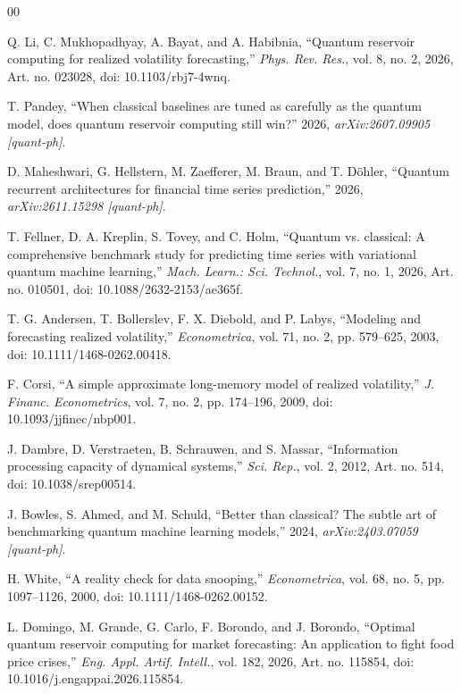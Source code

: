 \documentclass{ieeeaccess}
\begin{document}
\begin{thebibliography}{00}

Q. Li, C. Mukhopadhyay, A. Bayat, and A. Habibnia, ``Quantum reservoir computing for realized volatility forecasting,'' \emph{Phys. Rev. Res.}, vol. 8, no. 2, 2026, Art. no. 023028, doi: 10.1103/rbj7-4wnq.

T. Pandey, ``When classical baselines are tuned as carefully as the quantum model, does quantum reservoir computing still win?'' 2026, \emph{arXiv:2607.09905 [quant-ph]}.

D. Maheshwari, G. Hellstern, M. Zaefferer, M. Braun, and T. D\"ohler, ``Quantum recurrent architectures for financial time series prediction,'' 2026, \emph{arXiv:2611.15298 [quant-ph]}.

T. Fellner, D. A. Kreplin, S. Tovey, and C. Holm, ``Quantum vs. classical: A comprehensive benchmark study for predicting time series with variational quantum machine learning,'' \emph{Mach. Learn.: Sci. Technol.}, vol. 7, no. 1, 2026, Art. no. 010501, doi: 10.1088/2632-2153/ae365f.

T. G. Andersen, T. Bollerslev, F. X. Diebold, and P. Labys, ``Modeling and forecasting realized volatility,'' \emph{Econometrica}, vol. 71, no. 2, pp. 579--625, 2003, doi: 10.1111/1468-0262.00418.

F. Corsi, ``A simple approximate long-memory model of realized volatility,'' \emph{J. Financ. Econometrics}, vol. 7, no. 2, pp. 174--196, 2009, doi: 10.1093/jjfinec/nbp001.

J. Dambre, D. Verstraeten, B. Schrauwen, and S. Massar, ``Information processing capacity of dynamical systems,'' \emph{Sci. Rep.}, vol. 2, 2012, Art. no. 514, doi: 10.1038/srep00514.

J. Bowles, S. Ahmed, and M. Schuld, ``Better than classical? The subtle art of benchmarking quantum machine learning models,'' 2024, \emph{arXiv:2403.07059 [quant-ph]}.

H. White, ``A reality check for data snooping,'' \emph{Econometrica}, vol. 68, no. 5, pp. 1097--1126, 2000, doi: 10.1111/1468-0262.00152.

L. Domingo, M. Grande, G. Carlo, F. Borondo, and J. Borondo, ``Optimal quantum reservoir computing for market forecasting: An application to fight food price crises,'' \emph{Eng. Appl. Artif. Intell.}, vol. 182, 2026, Art. no. 115854, doi: 10.1016/j.engappai.2026.115854.


\end{thebibliography}
\end{document}
